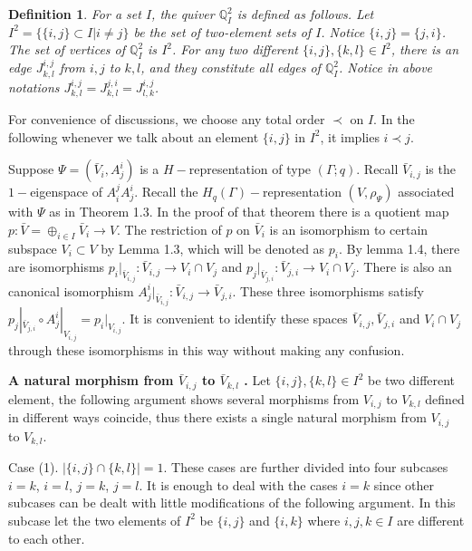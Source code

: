 \def\CTEXPreproc{Created by ctex v0.2.12, don't edit!}\documentclass[11pt]{article}
\newtheorem{defi}{Definition}[section]
\begin{document}
 \begin{defi}
 For a set $I$, the quiver $\mathbb{Q}^2 _I $ is defined as follows. Let $I^2 = \{ \{ i,j\} \subset I  |  i\neq j \} $ be the set of two-element sets of $I$. Notice $\{ i,j \} =\{ j,i\} $. The set of vertices of $\mathbb{Q}^2 _I $ is
 $ I^2  $. For any two different
 $\{ i,j  \} ,  \{ k,l\} \in I^2 $, there is an edge $J^{i,j}_{k,l}$ from ${i,j}$ to ${k,l}$, and they constitute all edges of $\mathbb{Q}^2 _I $.  Notice in above notations  $ J^{i,j} _{k,l} = J^{j,i} _{k,l} = J^{i,j}_{l,k}  $.

 \end{defi}

 For convenience of discussions, we choose any total order $ \prec $ on $I$. In the following whenever we talk about an element
 $\{ i,j\}  $ in $I^2$, it implies $i\prec j$.


 Suppose $\Psi=(\bar{V}_i , A^i _j )$ is a $H-$representation of type $(\Gamma ;q)$. Recall $\bar{V}_{i,j}$ is the $1-$eigenspace of
 $A^j _i A^i _j$. Recall the $H_q (\Gamma)-$representation $(  V,  \rho_{\Psi})$ associated with $\Psi$ as in Theorem 1.3. In the proof of that theorem there is a quotient map $p: \bar{V}= \oplus_{i\in I} \bar{V}_i \rightarrow V$. The restriction of $p$ on $\bar{V}_i$ is an isomorphism to certain subspace $V_i \subset V$ by Lemma 1.3, which will be denoted as $p_i$. By lemma 1.4, there are isomorphisms
 $p_i |_{ \bar{V}_{i,j}   } : \bar{V}_{i,j} \rightarrow V_i \cap V_j$ and $p_j |_{ \bar{V}_{j,i}   } : \bar{V}_{j,i} \rightarrow V_i \cap V_j$. There is also an canonical isomorphism $A^i _j |_{ \bar{V}_{i,j}  } : \bar{V}_{i,j} \rightarrow \bar{V}_{j,i} $.  These three isomorphisms satisfy $p_j |_{ \bar{V}_{j,i}  } \circ A^i _j |_{V_{i,j}}= p_i |_{ V_{i,j} }   $. It is convenient to identify these
 spaces $ \bar{V}_{i,j} ,  \bar{V}_{j,i} $ and $V_i \cap V_j$ through these isomorphisms in this way without making any confusion.


\noindent \textbf{A natural morphism from $\bar{V}_{i,j}$ to $\bar{V}_{k,l}$ .}
 Let $\{ i,j\} ,\{ k,l\} \in I^2$ be two different element,  the following argument shows several morphisms from  $V_{i,j}$ to $V_{k,l}$ defined in different ways coincide, thus there exists a single natural morphism from  $V_{i,j}$ to $V_{k,l}$.

\noindent Case (1).  $| \{ i,j \} \cap \{ k,l \} |=1$.
These cases are further divided into four subcases $i=k$, $i=l$, $j=k $, $j=l$. It is enough to deal with the cases $i=k$ since other subcases can be dealt with little modifications of the following argument. In this subcase let the two elements of $I^2$  be $\{ i,j\} $ and $\{ i,k\} $ where $i,j,k\in I$ are different to each other.
\end{document}
